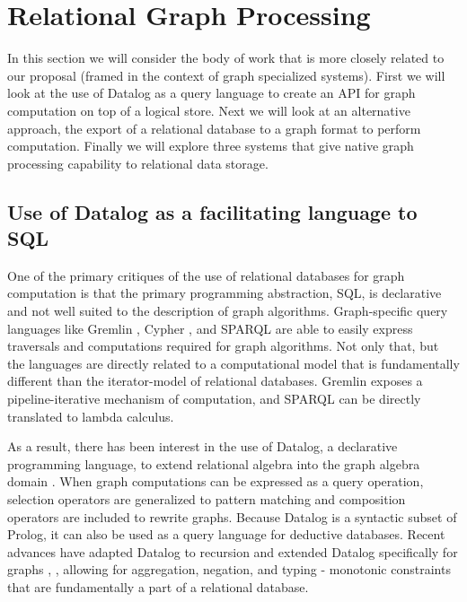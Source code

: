 \documentclass[11pt,letterpaper]{article}
\begin{document}
\section*{Relational Graph Processing}

In this section we will consider the body of work that is more closely related to our proposal (framed in the context of graph specialized systems). First we will look at the use of Datalog as a query language to create an API for graph computation on top of a logical store. Next we will look at an alternative approach, the export of a relational database to a graph format to perform computation. Finally we will explore three systems that give native graph processing capability to relational data storage.

\subsection*{Use of Datalog as a facilitating language to SQL}

One of the primary critiques of the use of relational databases for graph computation is that the primary programming abstraction, SQL, is declarative and not well suited to the description of graph algorithms. Graph-specific query languages like Gremlin \cite{rodriguez_gremlin_2013}, Cypher \cite{miller_graph_2013}, and SPARQL \cite{prudhommeaux_sparql_2008} are able to easily express traversals and computations required for graph algorithms. Not only that, but the languages are directly related to a computational model that is fundamentally different than the iterator-model of relational databases. Gremlin exposes a pipeline-iterative mechanism of computation, and SPARQL can be directly translated to lambda calculus.

As a result, there has been interest in the use of Datalog, a declarative programming language, to extend relational algebra into the graph algebra domain \cite{he_graphs-at--time:_2008}. When graph computations can be expressed as a query operation, selection operators are generalized to pattern matching and composition operators are included to rewrite graphs. Because Datalog is a syntactic subset of Prolog, it can also be used as a query language for deductive databases. Recent advances have adapted Datalog to recursion and extended Datalog specifically for graphs \cite{shkapsky_graph_2013}, \cite{green_datalog_2013}, allowing for aggregation, negation, and typing - monotonic constraints that are fundamentally a part of a relational database.
\end{document}
